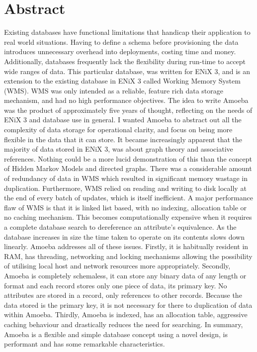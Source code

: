 \documentclass[11pt]{article}
\begin{document}
\section{Abstract}
Existing databases have functional limitations that handicap their application to real world situations. Having to define a schema before provisioning the data introduces unnecessary overhead into deployments, costing time and money. Additionally, databases frequently lack the flexibility during run-time to accept wide ranges of data. 
\newline
\newline
This particular database, was written for ENiX 3, and is an extension to the existing database in ENiX 3 called Working Memory System (WMS). WMS was only intended as a reliable, feature rich data storage mechanism, and had no high performance objectives. The idea to write Amoeba was the product of approximately five years of thought, reflecting on the needs of ENiX 3 and database use in general. I wanted Amoeba to abstract out all the complexity of data storage for operational clarity, and focus on being more flexible in the data that it can store. 
\newline
\newline
It became increasingly apparent that the majority of data stored in ENiX 3, was about graph theory and associative references. Nothing could be a more lucid demonstration of this than the concept of Hidden Markov Models and directed graphs. There was a considerable amount of redundancy of data in WMS which resulted in significant memory wastage in duplication. Furthermore, WMS relied on reading and writing to disk locally at the end of every batch of updates, which is itself inefficient.
\newline
\newline
A major performance flaw of WMS is that it is linked list based, with no indexing, allocation table or no caching mechanism. This becomes computationally expensive when it requires a complete database search to dereference an attribute's equivalence. As the database increases in size the time taken to operate on its contents slows down linearly. 
\newline
\newline
Amoeba addresses all of these issues. Firstly, it is habitually resident in RAM, has threading, networking and locking mechanisms allowing the possibility of utilising local host and network resources more appropriately. Secondly, Amoeba is completely schemaless, it can store any binary data of any length or format and each record stores only one piece of data, its primary key. No attributes are stored in a record, only references to other records. Because the data stored is the primary key, it is not necessary for there to duplication of data within Amoeba. Thirdly, Amoeba is indexed, has an allocation table, aggressive caching behaviour and drastically reduces the need for searching.
\newline
\newline
In summary, Amoeba is a flexible and simple database concept using a novel design, is performant and has some remarkable characteristics. 
\newpage
\noindent
\end{document}
